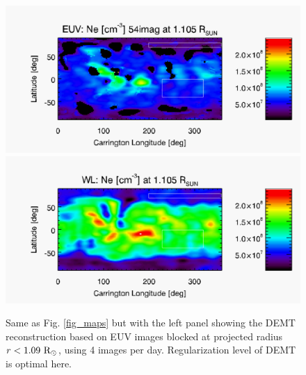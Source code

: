 \documentclass[baaa]{baaa}
\begin{document}
\clearpage

\begin{figure}[t]
  \centering
  \includegraphics[width=\columnwidth]{map_Ne_CR2198_DEMT-AIA_H1-L-05-035-045_r3D_1105_Rsun.pdf}
  \includegraphics[width=\columnwidth]{map_ne_kcor.pdf}
  \caption{Same as Fig. \ref{fig_maps} but with the left panel showing the DEMT reconstruction based on EUV images blocked at projected radius $r<1.09~\rm{R}_\odot$, using 4 images per day. Regularization level of DEMT is optimal here.}
  \label{fig_maps3}
\end{figure}
\end{document}

